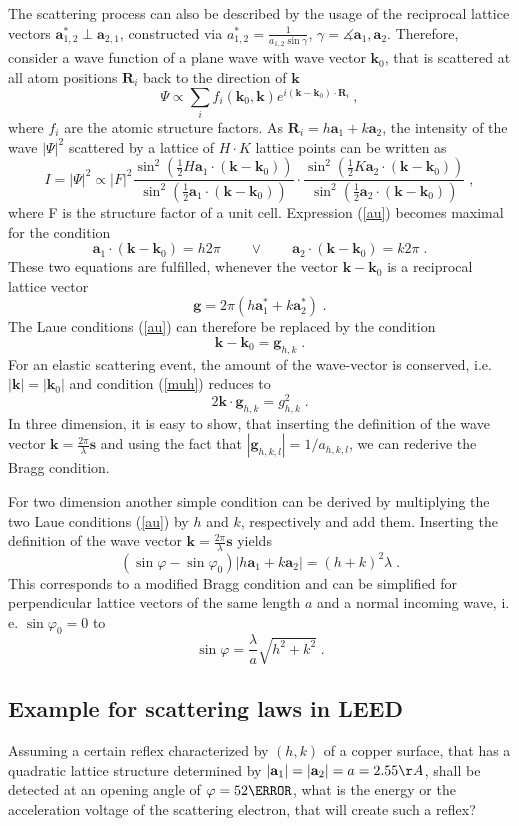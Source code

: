 \documentclass[a4paper]{scrartcl}
\numberwithin{equation}{section}
\numberwithin{figure}{section}
\numberwithin{table}{section}
\newcommand{\eq}[2]{\begin{equation}#1\label{#2}\end{equation}}
\newcommand{\Formel}[1]{(\ref{#1})}
\newcommand{\ve}[1]{\mathbf{ #1} }
\begin{document}
The scattering process can also be described by the usage of the reciprocal lattice vectors $\ve a_{1,2}^* \perp \ve a_{2,1}$, constructed via
$a_{1,2}^*=\frac{1}{a_{1,2} \sin \gamma} $, $\gamma = \measuredangle \ve a_1, \ve a_2 $. Therefore, consider a wave function of a plane wave with wave vector $\ve k_0$, that is scattered at all atom positions $\ve R_i$ back to the direction of $\ve k$ 
\eq{\Psi \propto \sum_{i} f_i(\ve k_0, \ve k) e^{i(\ve k - \ve k_0) \cdot \ve R_i} \ ,}{}
where $f_i$ are the atomic structure factors. As $\ve R_i=h \ve a_1 + k \ve a_2$, the intensity of the wave $|\Psi|^2$ scattered by a lattice of $H \cdot K$ lattice points can be written as
\eq{I=|\Psi|^2 \propto |F|^2 \frac{\sin^2 \left( \tfrac 1 2 H \ve a_1 \cdot (\ve k - \ve k_0) \right)}{\sin^2 \left( \tfrac 1 2 \ve a_1 \cdot ( \ve k - \ve k_0 ) \right)} \cdot \frac{\sin^2 \left( \tfrac 1 2 K \ve a_2 \cdot (\ve k - \ve k_0) \right)} {\sin^2 \left( \tfrac 1 2 \ve a_2 \cdot ( \ve k - \ve k_0 ) \right)} \; , } {au}
where F is the structure factor of a unit cell. Expression \Formel{au} becomes  maximal for the condition
\eq{\ve a_1 \cdot (\ve k - \ve k_0) = h 2 \pi \qquad \vee \qquad \ve a_2 \cdot (\ve k - \ve k_0) = k 2 \pi \;.}{}
These two equations are fulfilled, whenever the vector $\ve k - \ve k_0$ is a reciprocal lattice vector
\eq{\ve g = 2 \pi (h \ve a_1^{*} + k \ve a_2^*) \; .}{}
The Laue conditions \Formel{au} can therefore be replaced by the condition
\eq{\ve k - \ve k_0 =\ve g_{h,k} \;.}{muh}
For an elastic scattering event, the amount of the wave-vector is conserved, i.e. $|\ve k|=|\ve k_0|$ and condition \Formel{muh} reduces to
\eq{2\ve k \cdot \ve g_{h,k} = g_{h,k}^2 \; .}{}
In three dimension, it is easy to show, that inserting the definition of the wave vector $\ve k=\frac{2\pi}{\lambda} \ve s$ and using the fact that $|\ve g_{h,k,l}| = 1/a_{h,k,l}$, we can rederive the Bragg condition. 

For two dimension another simple condition can be derived by multiplying the two Laue conditions \Formel{au} by $h$ and $k$, respectively and add them. Inserting the definition of the wave vector $\ve k=\frac{2\pi}{\lambda} \ve s$ yields
\eq{(\sin \varphi - \sin \varphi_0) |h \ve a_1 + k \ve a_2| = (h + k)^2 \lambda \; .} {}
This corresponds to a modified Bragg condition and can be simplified for perpendicular lattice vectors of the same length $a$ and a normal incoming wave, i. e. $\sin \varphi_0  =0$ to
\eq{\sin \varphi =\frac{\lambda}{a} \sqrt{h^2+k^2} \; .}{nm}

\subsection{Example for scattering laws in LEED}
Assuming a certain reflex characterized by $(h,k)$ of a copper surface, that has a quadratic lattice structure determined by $|\ve a_1|=|\ve a_2|=a=2.55 \AA$, shall be detected at an opening angle of $\varphi = 52 \degree$, what is the energy or the acceleration voltage of the scattering electron, that will create such a reflex?
\end{document}
